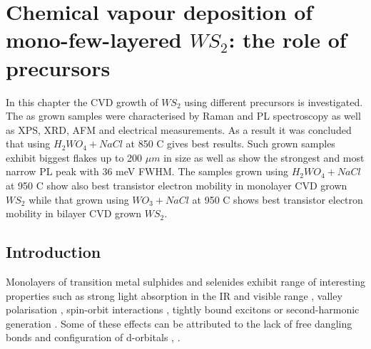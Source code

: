 \chapter{Chemical vapour deposition of mono-few-layered $WS_2$: the role of precursors}

In this chapter the CVD growth of $WS_2$ using different precursors is investigated. The as grown samples were characterised by Raman and PL spectroscopy as well as XPS, XRD, AFM and electrical measurements. As a result it was concluded that using $H_2WO_4 + NaCl$ at 850 {\degree}C gives best results. Such grown samples exhibit biggest flakes up to 200 $\mu m$ in size as well as show the strongest and most narrow PL peak with 36 meV FWHM. The samples grown using $H_2WO_4 + NaCl$ at 950 {\degree}C show also best transistor electron mobility in monolayer CVD grown $WS_2$ while that grown using $WO_3 + NaCl$ at 950 {\degree}C shows best transistor electron mobility in bilayer CVD grown $WS_2$. 

\section{Introduction}
	
Monolayers of transition metal sulphides and selenides exhibit range of interesting properties such as strong light absorption in the IR and visible range \cite{AtomicallyThinMoS2ANewDirect-GapSemiconductor}\cite{ExtraordinarySunlightAbsorptionAndOneNanometerThickPhotovoltaicsUsingTwo-DimensionalMonolayerMaterials}\cite{EvolutionOfElectronicStructureInAtomicallyThinSheetsOfWS2AndWSe2}, valley polarisation \cite{ControlOfValleyPolarizationInMonolayerMoS2ByOpticalHelicity} \cite{ValleyPolarizationInMoS2MonolayersByOpticalPumping}, spin-orbit interactions \cite{CoupledSpinAndValleyPhysicsInMonolayersOfMoS2AndOtherGroup-VIDichalcogenides}\cite{GiantSpin-orbit-inducedSpinSplittingInTwo-dimensionalTransition-metalDichalcogenideSemiconductors}, tightly bound excitons \cite{TightlyBoundTrionsInMonolayer} or second-harmonic generation \cite{ProbingSymmetryPropertiesOfFew-LayerMoS2Andh-BNByOpticalSecond-HarmonicGeneration}. Some of these effects can be attributed to the lack of free dangling bonds and configuration of d-orbitals \cite{TheTransitionMetalDichalcogenidesDiscussionAndInterpretationOfTheObservedOpticalElectricalAndStructuralProperties}, \cite{ElectronicPropertiesOfMoS2Nanoparticles}.

